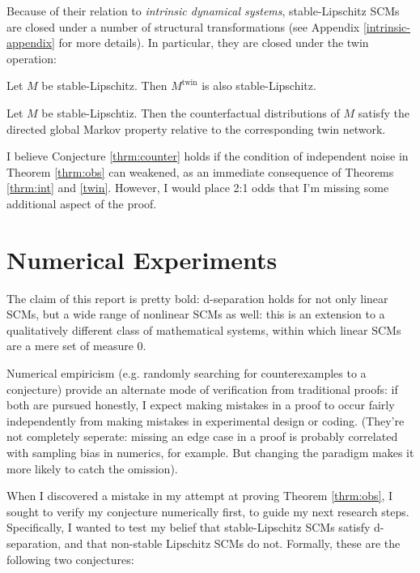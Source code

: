 \documentclass[12pt]{article}
\begin{document}
Because of their relation to \emph{intrinsic dynamical systems}, stable-Lipschitz SCMs are closed under a number of structural transformations (see Appendix \ref{intrinsic-appendix} for more details). In particular, they are closed under the twin operation:

\begin{theorem} \label{twin}
Let $M$ be stable-Lipschitz. Then $M^{\text{twin}}$ is also stable-Lipschitz.
\end{theorem}

\begin{conjecture} \label{thrm:counter}
Let $M$ be stable-Lipschtiz. Then the counterfactual distributions of $M$ satisfy the directed global Markov property relative to the corresponding twin network.
\end{conjecture}

I believe Conjecture \ref{thrm:counter} holds if the condition of independent noise in Theorem \ref{thrm:obs} can weakened, as an immediate consequence of Theorems \ref{thrm:int} and \ref{twin}. However, I would place 2:1 odds that I'm missing some additional aspect of the proof.

\section{Numerical Experiments}\label{numerics}

The claim of this report is pretty bold: d-separation holds for not only linear SCMs, but a wide range of nonlinear SCMs as well: this is an extension to a qualitatively different class of mathematical systems, within which linear SCMs are a mere set of measure 0. 

Numerical empiricism (e.g. randomly searching for counterexamples to a conjecture) provide an alternate mode of verification from traditional proofs: if both are pursued honestly, I expect making mistakes in a proof to occur fairly independently from making mistakes in experimental design or coding. (They're not completely seperate: missing an edge case in a proof is probably correlated with sampling bias in numerics, for example. But changing the paradigm makes it more likely to catch the omission).


When I discovered a mistake in my attempt at proving Theorem \ref{thrm:obs}, I sought to verify my conjecture numerically first, to guide my next research steps.
Specifically, I wanted to test my belief that stable-Lipschitz SCMs satisfy d-separation, and that non-stable Lipschitz SCMs do not.
Formally, these are the following two conjectures:
\end{document}
